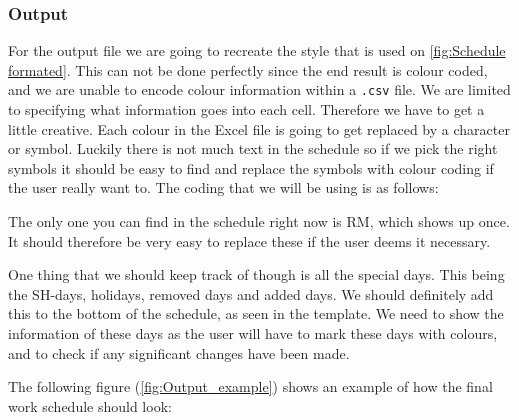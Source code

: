 \subsubsection{Output}
For the output file we are going to recreate the style that is used on \ref{fig:Schedule formated}. This can not be done perfectly since the end result is colour coded, and we are unable to encode colour information within a \verb|.csv| file. We are limited to specifying what information goes into each cell. Therefore we have to get a little creative. Each colour in the Excel file is going to get replaced by a character or symbol. Luckily there is not much text in the schedule so if we pick the right symbols it should be easy to find and replace the symbols with colour coding if the user really want to. The coding that we will be using is as follows:

\begin{itemize}
\end{itemize}

The only one you can find in the schedule right now is RM, which shows up once. It should therefore be very easy to replace these if the user deems it necessary. 


One thing that we should keep track of though is all the special days. This being the SH-days, holidays, removed days and added days. We should definitely add this to the bottom of the schedule, as seen in the template. We need to show the information of these days as the user will have to mark these days with colours, and to check if any significant changes have been made.

The following figure (\ref{fig:Output_example}) shows an example of how the final work schedule should look:

